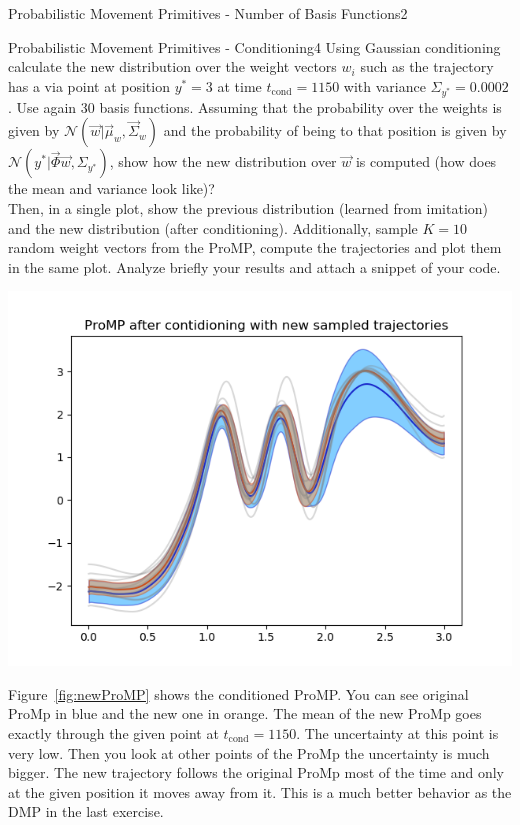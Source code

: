 \begin{questions}
\begin{question}[bonus]{Probabilistic Movement Primitives - Number of Basis Functions}{2}
\end{question}



\begin{question}[bonus]{Probabilistic Movement Primitives - Conditioning}{4}
Using Gaussian conditioning calculate the new distribution over the weight vectors $w_i$ such as the trajectory has a via point at position $y^*=3$ at time $t_\textrm{cond}=1150$ with variance $\Sigma_{y^*}=0.0002$. Use again 30 basis functions.
Assuming that the probability over the weights is given by $\mathcal{N}(\vec w|\vec \mu_w,\vec \Sigma_w)$ and the probability of being to that position is given by $\mathcal{N}(y^*|\vec \Phi \vec w, \Sigma_{y^*} )$, show how the new distribution over $\vec w$ is computed (how does the mean and variance look like)?
\\
Then, in a single plot, show the previous distribution (learned from imitation) and the new distribution (after conditioning). Additionally, sample $K=10$ random weight vectors from the ProMP, compute the trajectories and plot them in the same plot. Analyze briefly your results and attach a snippet of your code.

\begin{answer}
\begin{center}
	\includegraphics[width=0.7\linewidth]{img/2i.png}
	\label{fig:newProMP}
\end{center}

Figure~\ref{fig:newProMP} shows the conditioned ProMP. You can see original ProMp in blue and the new one in orange. The mean of the new ProMp goes exactly through the given point at $t_\textrm{cond}=1150$. The uncertainty at this point is very low. Then you look at other points of the ProMp the uncertainty is much bigger. The new trajectory follows the original ProMp most of the time and only at the given position it moves away from it. This is a much better behavior as the DMP in the last exercise.


\end{answer}

\end{question}

\end{questions}

